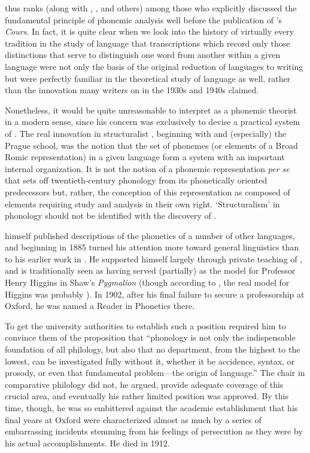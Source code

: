 {\Sweet} thus ranks (along with , {\DeCourtenay}, and
others) among those who explicitly discussed the fundamental principle
of phonemic analysis well before the publication of {\Saussure}'s
\textsl{Cours}. In fact, it is quite clear when we look into the history of
virtually every tradition in the study of language that transcriptions
which record only those distinctions that serve to distinguish one
word from another within a given language were not only the basis of
the original reduction of languages to writing but were perfectly
familiar in the theoretical study of language as well, rather than the
innovation many writers on  in the 1930s and 1940s
claimed.

Nonetheless, it would be quite unreasonable to interpret {\Sweet} as a
phonemic theorist in a modern sense, since his concern was exclusively
to devise a practical system of . The real innovation in
structuralist , beginning with {\Saussure} and
(especially) the Prague school, was the notion that the set of
phonemes (or elements of a Broad Romic representation) in a given
language form a system with an important internal organization. It is
not the notion of a phonemic representation \emph{per se} that sets
off twentieth-century phonology from its phonetically oriented
predecessors but, rather, the conception of this representation as
composed of elements requiring study and analysis in their own
right. `Structuralism' in phonology should not be identified with the
discovery of .

{\Sweet} himself published descriptions of the phonetics of a number of
other languages, and beginning in 1885 turned his attention more
toward general linguistics than to his earlier work in . He
supported himself largely through private teaching of , and is
traditionally seen as having served (partially) as the model for
Professor Henry Higgins in Shaw's \emph{Pygmalion} (though according
to \citet{collins.mees99:jones}, the real model for Higgins was
probably ). In 1902, after his final failure to secure a
professorship at Oxford, he was named a Reader in Phonetics there.

To get the university authorities to establish such a position
required him to convince them of the proposition that ``phonology is
not only the indispensable foundation of all philology, but also that
no department, from the highest to the lowest, can be investigated
fully without it, whether it be accidence, syntax, or prosody, or even
that fundamental problem—the origin of language.'' The chair in
comparative philology did not, he argued, provide adequate coverage of
this crucial area, and eventually his rather limited position was
approved. By this time, though, he was so embittered against the
academic establishment that his final years at Oxford were
characterized almost as much by a series of embarrassing incidents
stemming from his feelings of persecution as they were by his actual
accomplishments. He died in 1912.

